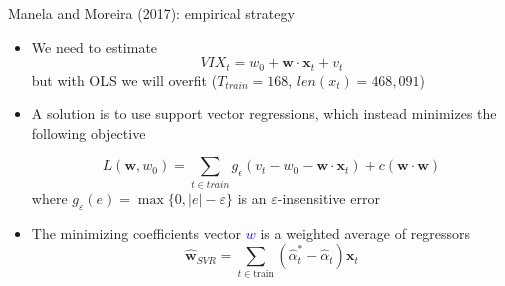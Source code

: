 \documentclass[english]{beamer}
\begin{document}
\begin{frame}{Manela and Moreira (2017): empirical strategy}
\begin{itemize}
\setlength{\itemsep}{1.2em}
\item We need to estimate $$
VIX_{t}=w_{0}+\mathbf{w} \cdot \mathbf{x}_{t}+v_{t}
$$ but with OLS we will overfit ($T_{train} = 168$, $len(x_t) = 468,091$)
\pause
\item A solution is to use support vector regressions, which instead minimizes the following objective 

$$
L\left(\mathbf{w}, w_{0}\right)=\sum_{t \in t r a i n} g_{\epsilon}\left(v_{t}-w_{0}-\mathbf{w} \cdot \mathbf{x}_{t}\right)+c(\mathbf{w} \cdot \mathbf{w})
$$
where $g_{\varepsilon}(e)=\max \{0,|e|-\varepsilon\}$ is an $\varepsilon$-insensitive error
\pause
\item The minimizing coefficients vector \textcolor{blue}{$w$} is a weighted average of regressors $$
\hat{\mathbf{w}}_{S V R}=\sum_{t \in \text {train}}\left(\hat{\alpha}_{t}^{*}-\hat{\alpha}_{t}\right) \mathbf{x}_{t}
$$

\end{itemize}
\end{frame}%
\end{document}
